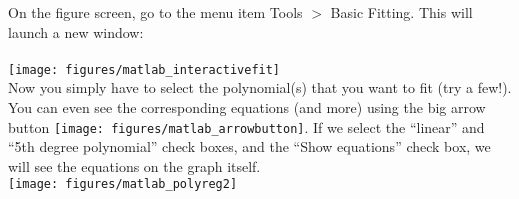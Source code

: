 On the figure screen, go to the menu item Tools $>$ Basic Fitting.  This will launch a new window:\\
\\
\texttt{[image: figures/matlab\_interactivefit]}\\

Now you simply have to select the polynomial(s) that you want to fit (try a few!).  You can even see the corresponding equations (and more) using the big arrow button \texttt{[image: figures/matlab\_arrowbutton]}.  If we select the ``linear'' and ``5th degree polynomial'' check boxes, and the ``Show equations'' check box, we will see the equations on the graph itself.\\

\hspace{-.2in}\texttt{[image: figures/matlab\_polyreg2]}

\newpage
{}

%
%
